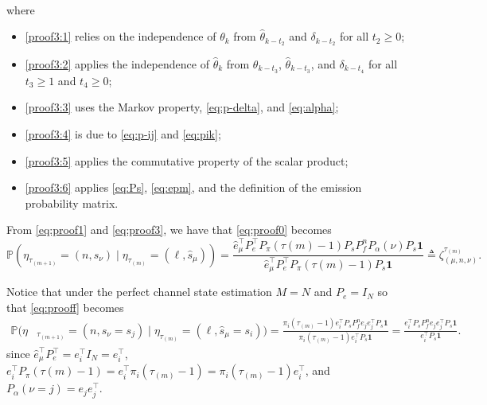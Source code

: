 \documentclass[journal,twoside,web]{ieeecolor}
\begin{document}
\begin{figure*}[ht]
\begin{align}
\begin{aligned}
\end{aligned}
\end{align}
where 
\begin{itemize}
    \item \eqref{proof3:1} relies on the independence of $\theta_{k}$ from $\hat{\theta}_{k-t_2}$ and $\delta_{k-t_2}$ for all $t_2\geq 0$;
    \item \eqref{proof3:2} applies the independence of $\hat{\theta}_{k}$ from $\theta_{k-t_3}$, $\hat{\theta}_{k-t_3}$, and $\delta_{k-t_4}$ for all $t_3\geq 1$ and $t_4\geq 0$;
    \item \eqref{proof3:3} uses the Markov property, \eqref{eq:p-delta}, and \eqref{eq:alpha};
    \item \eqref{proof3:4} is due to \eqref{eq:p-ij} and \eqref{eq:pik};
    \item \eqref{proof3:5} applies the commutative property of the scalar product;
    \item \eqref{proof3:6} applies \eqref{eq:Ps}, \eqref{eq:epm}, and the definition of the emission probability matrix.
\end{itemize}
\end{figure*}
\begin{figure*}[ht]
\raggedright
From \eqref{eq:proof1} and \eqref{eq:proof3}, we have that \eqref{eq:proof0} becomes
\begin{equation}\label{eq:prooff}
\mathbb{P}(\eta_{\tau_{(m+1)}}^{} = (n,\hat{s}_{\nu}) \mid \eta_{\tau_{(m)}}^{} = (\ell,\hat{s}_{\mu})) =
    \frac{\hat{e}_{\mu}^{\top} P_{e}^{\top} P_{\pi}(\tau{(m)}-1) P_{s} P_{f}^{n} P_{\alpha}(\nu) P_{s} \mathbf{1}}{\hat{e}_{\mu}^{\top} P_{e}^{\top} P_{\pi}(\tau{(m)}-1) P_{s}\mathbf{1}} \triangleq \zeta_{(\mu,n,\nu)}^{\tau_{(m)}}.
\end{equation}
\end{figure*}
\begin{figure*}[ht]
\raggedright
Notice that under the perfect channel state estimation $M=N$ and $P_e = I_{N}$ so that \eqref{eq:prooff} becomes
\begin{align}
\mathbb{P}(\eta&_{\tau_{(m+1)}}^{} = (n,\hat{s}_{\nu}=s_j) \mid \eta_{\tau_{(m)}}^{} = (\ell,\hat{s}_{\mu}=s_i)) =
    \frac{\pi_{i}(\tau_{(m)}-1)e_{i}^{\top} P_{s} P_{f}^{n} e_{j}e_{j}^{\top} P_{s} \mathbf{1}}{\pi_{i}(\tau_{(m)}-1)e_{i}^{\top} P_{s}\mathbf{1}} = \frac{e_{i}^{\top} P_{s} P_{f}^{n} e_{j}e_{j}^{\top} P_{s} \mathbf{1}}{e_{i}^{\top} P_{s}\mathbf{1}}.
\end{align}
since $\hat{e}_{\mu}^{\top} P_{e}^{\top} = e_{i}^{\top} I_{N} = e_{i}^{\top}$, $e_{i}^{\top} P_{\pi}(\tau{(m)}-1)=e_{i}^{\top}\pi_{i}(\tau_{(m)}-1)=\pi_{i}(\tau_{(m)}-1)e_{i}^{\top}$, and $P_{\alpha}(\nu=j)=e_{j}e_{j}^{\top}$.
\end{figure*}
\end{document}
